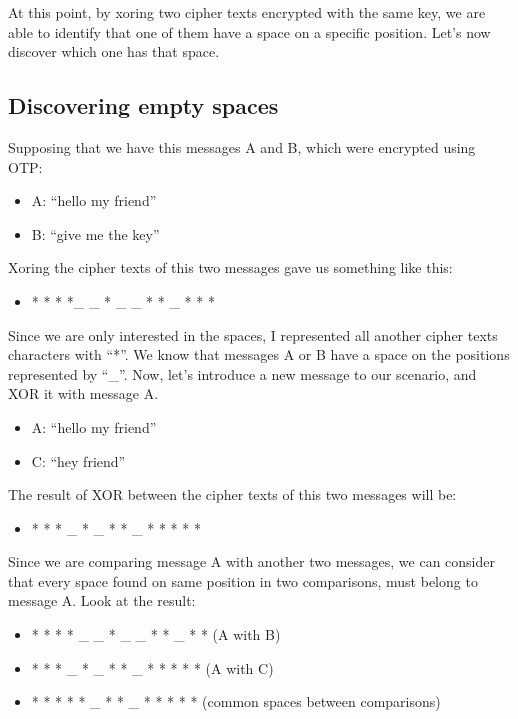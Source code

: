 \documentclass[journal]{IEEEtran}
\begin{document}
At this point, by xoring two cipher texts encrypted with the same key, we are able to identify that one of them have a space on a specific position. Let’s now discover which one has that space.

\subsection{Discovering empty spaces}
Supposing that we have this messages A and B, which were encrypted using OTP:

\begin{itemize}
	\item A: “hello my friend”
	\item B: “give me the key”
\end{itemize}

Xoring the cipher texts of this two messages gave us something like this:

\begin{itemize}
	\item * * * *\_ \_ * \_ \_ * * \_ * * *
\end{itemize}

Since we are only interested in the spaces, I represented all another cipher texts characters with “*”. We know that messages A or B have a space on the positions represented by “\_”. Now, let’s introduce a new message to our scenario, and XOR it with message A.

\begin{itemize}
	\item A: “hello my friend”
	\item C: “hey friend”
\end{itemize}

The result of XOR between the cipher texts of this two messages will be:

\begin{itemize}
	\item * * * \_ * \_ * * \_ * * * * *
\end{itemize}

Since we are comparing message A with another two messages, we can consider that every space found on same position in two comparisons, must belong to message A. Look at the result:

\begin{itemize}
	\item * * * * \_ \_ * \_ \_ * * \_ * * (A with B)
	\item * * * \_ * \_ * * \_ * * * * * (A with C)
	\item * * * * * \_ * * \_ * * * * * (common spaces between comparisons)
\end{itemize}
\end{document}
